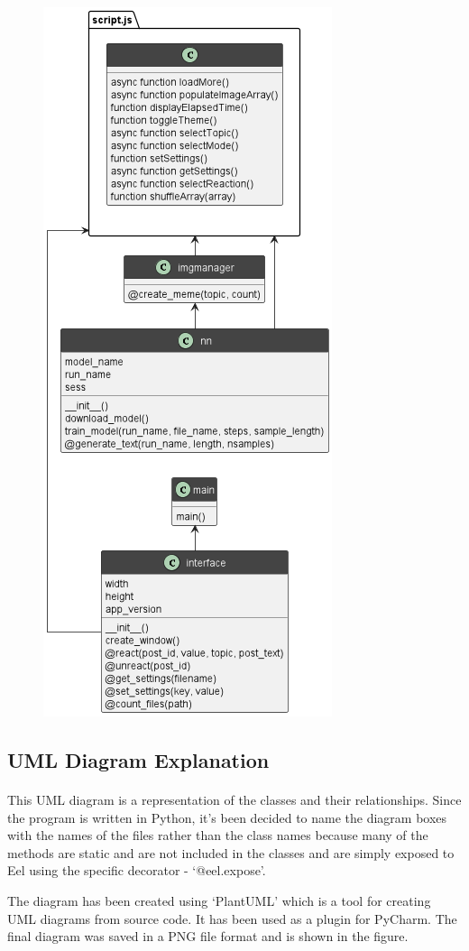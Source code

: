\documentclass[12pt]{report}
\begin{document}
\begin{appendices}
\begin{figure}[ht]
  \centering
  \includegraphics[width=.4\linewidth]{img/uml.png}
  \label{fig:uml}
\end{figure}

\clearpage

\subsection*{UML Diagram Explanation}
\label{appendix:uml_explanation}
\paragraph{}
This UML diagram is a representation of the classes and their relationships. Since the program is written in Python, it's
been decided to name the diagram boxes with the names of the files rather than the class names because many of the
methods are static and are not included in the classes and are simply exposed to Eel using the specific decorator -
`@eel.expose'.

The diagram has been created using `PlantUML' which is a tool for creating UML diagrams from source code. It has been
used as a plugin for PyCharm. The final diagram was saved in a PNG file format and is shown in the figure.


\end{appendices}
\end{document}
